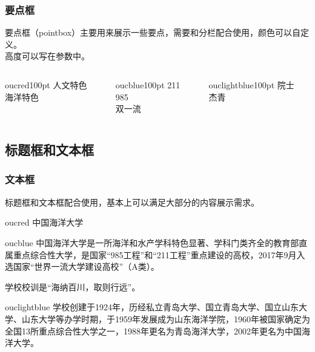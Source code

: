 \documentclass[aspectratio=169,UTF8,t]{beamer}%
\begin{document}
\begin{frame}
    \frametitle{要点框}
    要点框（pointbox）主要用来展示一些要点，需要和分栏配合使用，颜色可以自定义。 \\   
    高度可以写在参数中。  
      \begin{columns}
        \begin{column}{0.3\textwidth}
            \begin{pointbox}[要点一]{oucred}{100pt}
                人文特色\\
                海洋特色\\                
            \end{pointbox}
        \end{column}
        \begin{column}{0.3\textwidth}
            \begin{pointbox}[要点二]{oucblue}{100pt}
                211\\
                985\\
                双一流 
            \end{pointbox}            
        \end{column}
        \begin{column}{0.3\textwidth}
            \begin{pointbox}[要点三]{ouclightblue}{100pt}
                院士\\
                杰青 
            \end{pointbox}
        \end{column}
    \end{columns}    
\end{frame}

\subsection{标题框和文本框}

\begin{frame}
    \frametitle{文本框}
    标题框和文本框配合使用，基本上可以满足大部分的内容展示需求。 \\       
    \begin{headbox}{oucred}
        中国海洋大学
    \end{headbox}  
    \begin{textbox}{oucblue}
        中国海洋大学是一所海洋和水产学科特色显著、学科门类齐全的教育部直属重点综合性大学，是国家“985工程”和“211工程”重点建设的高校，2017年9月入选国家“世界一流大学建设高校”（A类）。

        学校校训是“海纳百川，取则行远”。
    \end{textbox}
    \begin{textbox}{ouclightblue}
        学校创建于1924年，历经私立青岛大学、国立青岛大学、国立山东大学、山东大学等办学时期，于1959年发展成为山东海洋学院，1960年被国家确定为全国13所重点综合性大学之一，1988年更名为青岛海洋大学，2002年更名为中国海洋大学。
    \end{textbox}
      
\end{frame}
\end{document}
